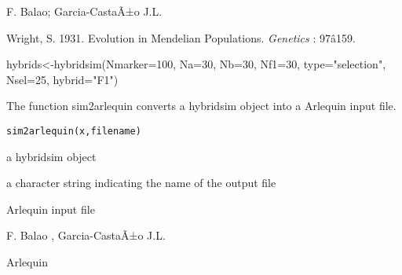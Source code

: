 \documentclass[letterpaper]{book}
\begin{document}
%
\begin{Author}\relax
F. Balao;
Garcia-CastaÃ±o J.L.
\end{Author}
%
\begin{References}\relax
Wright, S. 1931. Evolution in Mendelian Populations. \emph{Genetics} : 97â159. 
\end{References}
%
\begin{SeeAlso}\relax
{}
\end{SeeAlso}
%
\begin{Examples}
\begin{ExampleCode}
hybrids<-hybridsim(Nmarker=100, Na=30, Nb=30, Nf1=30, type="selection", Nsel=25, hybrid="F1")
\end{ExampleCode}
\end{Examples}
%
\begin{Description}\relax
The function sim2arlequin converts a hybridsim object into a Arlequin input file. 

\end{Description}
%
\begin{Usage}
\begin{verbatim}
sim2arlequin(x,filename)
\end{verbatim}
\end{Usage}
%
\begin{Arguments}
\begin{ldescription}

\item[\code{x}] 
a hybridsim object

\item[\code{filename}] 
a character string indicating the name of the output file
\end{ldescription}
\end{Arguments}
%
\begin{Value}
Arlequin input file
\end{Value}
%
\begin{Author}\relax
F. Balao , Garcia-CastaÃ±o J.L.
\end{Author}
%
\begin{References}\relax
Arlequin
\end{References}
%
\begin{SeeAlso}\relax
{}
\end{SeeAlso}
\end{document}
